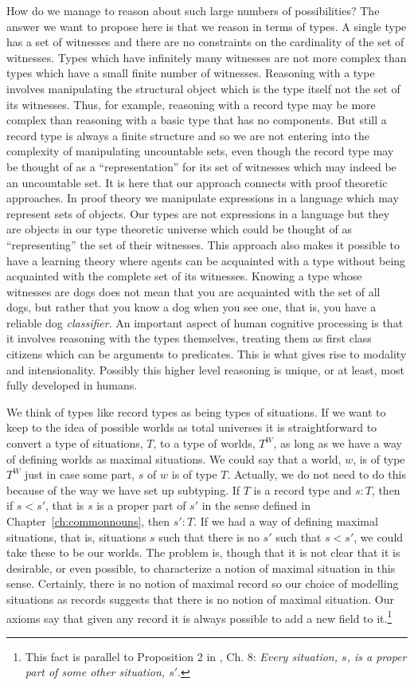 How do we manage to reason about such large numbers of possibilities?
The answer we want to propose here is that we reason in terms of
types.  A single type has a set of witnesses and there are no
constraints on the cardinality of the set of witnesses.  Types which
have infinitely many witnesses are not more complex than types which
have a small finite number of witnesses.  Reasoning with a type
involves manipulating the structural object which is the type itself
not the set of its witnesses.  Thus, for example, reasoning with a
record type may be more complex than reasoning with a basic type that
has no components.  But still a record type is always a finite
structure and so we are not entering into the complexity of
manipulating uncountable sets, even though the record type may be
thought of as a ``representation'' for its set of witnesses which may
indeed be an uncountable set.  It is here that our approach connects
with proof theoretic approaches.  In proof theory we manipulate
expressions in a language which may represent sets of objects.  Our
types are not expressions in a language but they are objects in our
type theoretic universe which could be thought of as ``representing''
the set of their witnesses.  This approach also makes it possible to have a
learning theory where agents can be acquainted with a type without
being acquainted with the complete set of its witnesses.  Knowing a
type whose witnesses are dogs does not mean that you are acquainted
with the set of all dogs, but rather that you know a dog when you see
one, that is, you have a reliable dog \textit{classifier}.  An important aspect of human cognitive processing is
that it involves reasoning with the types themselves, treating them as
first class citizens which can be arguments to predicates.  This is
what gives rise to modality and intensionality.  Possibly this higher
level reasoning is unique, or at least, most fully developed in
humans.

We think of types like record types as being types of
situations.  If we want to keep to the idea of possible worlds as
total universes it is straightforward to convert a type of situations, $T$,
to a type of worlds, $T^W$, as long as we have a way of defining
worlds as maximal situations.  We could say that a world, $w$, is of
type $T^W$ just in case some part, $s$ of $w$ is of type $T$.
Actually, we do not need to do this because of the way we have set up
subtyping.  If $T$ is a record type and $s:T$, then if $s<s'$, that is
$s$ is a proper part of $s'$ in the sense defined in
Chapter~\ref{ch:commonnouns}, then $s':T$.  If we had a way of
defining maximal situations, that is, situations $s$ such that there
is no $s'$ such that $s<s'$, we could take these to be our worlds.
The problem is, though that it
is not clear that it is desirable, or even possible, to characterize a
notion of maximal situation in this sense.  Certainly, there is no
notion of maximal record so our choice of modelling situations as
records suggests that there is no notion of maximal situation.  Our axioms say that given any record it is
always possible to add a new field to it.\footnote{This fact is
  parallel to Proposition 2 in \cite{Barwise1989}, Ch. 8:
  \textit{Every situation, $s$, is a proper part of some other
    situation, $s'$}.}  

